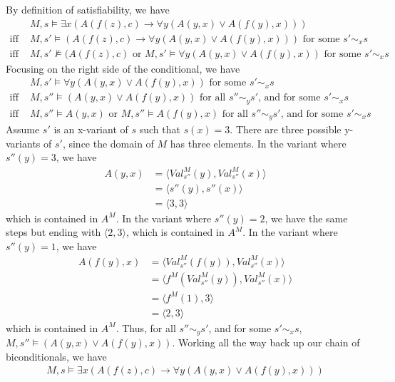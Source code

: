 \documentclass[11pt]{article}
\begin{document}
\color{RoyalBlue}
\noindent
By definition of satisfiability, we have
\begin{align*}
    & M,s \models \exists x(A(f(z), c) \rightarrow \forall y(A(y,x) \vee A(f(y),x))) \\
    \text{iff } & M,s' \models (A(f(z), c) \rightarrow \forall y(A(y,x) \vee A(f(y),x))) \text{ for some $s' \sim_x s$} \\
    \text{iff } & M,s' \not\models (A(f(z), c) \text{ or } M,s' \models \forall y(A(y,x) \vee A(f(y),x)) \text{ for some $s' \sim_x s$}
\end{align*}
Focusing on the right side of the conditional, we have
\begin{align*}
    & M,s' \models \forall y(A(y,x) \vee A(f(y),x)) \text{ for some $s' \sim_x s$} \\
    \text{iff } & M,s'' \models (A(y, x) \vee A(f(y), x)) \text{ for all $s''\sim_y s'$, and for some $s'\sim_x s$} \\
    \text{iff } & M,s'' \models A(y, x) \text{ or } M,s'' \models A(f(y), x) \text{ for all $s''\sim_y s'$, and for some $s'\sim_x s$}
\end{align*}
Assume $s'$ is an x-variant of $s$ such that $s(x) = 3$. There are three possible y-variants of $s'$, since the domain of $M$ has three elements. In the variant where $s''(y) = 3$, we have 
\begin{align*}
    A(y,x) & = \langle Val_{s''}^{M}(y), Val_{s''}^{M}(x) \rangle \\
    & = \langle s''(y), s''(x) \rangle \\
    & = \langle 3, 3 \rangle
\end{align*}
which is contained in $A^M$. In the variant where $s''(y) = 2$, we have the same steps but ending with $\langle 2, 3 \rangle$, which is contained in $A^M$. In the variant where $s''(y) = 1$, we have
\begin{align*}
    A(f(y), x) & = \langle Val_{s''}^{M}(f(y)), Val_{s''}^{M}(x) \rangle \\
    & = \langle f^{M}(Val_{s''}^{M}(y)), Val_{s''}^{M}(x) \rangle \\
    & = \langle f^{M}(1), 3 \rangle \\
    & = \langle 2, 3 \rangle
\end{align*}
which is contained in $A^M$. Thus, for all $s''\sim_y s'$, and for some $s'\sim_x s$, $M,s'' \models (A(y, x) \vee A(f(y), x))$. Working all the way back up our chain of biconditionals, we have 
\begin{align*}
    M,s \models \exists x(A(f(z), c) \rightarrow \forall y(A(y,x) \vee A(f(y),x)))
\end{align*}
\color{black}
\end{document}
